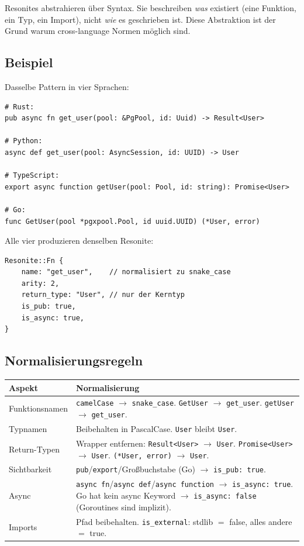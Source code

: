 \documentclass[11pt,a4paper]{article}
\begin{document}
Resonites abstrahieren \"uber Syntax. Sie beschreiben 
\emph{was} existiert (eine Funktion, ein Typ, ein Import), 
nicht \emph{wie} es geschrieben ist. Diese Abstraktion ist 
der Grund warum cross-language Normen m\"oglich sind.

\subsection{Beispiel}

Dasselbe Pattern in vier Sprachen:

\begin{lstlisting}[style=bash]
# Rust:
pub async fn get_user(pool: &PgPool, id: Uuid) -> Result<User>

# Python:
async def get_user(pool: AsyncSession, id: UUID) -> User

# TypeScript:
export async function getUser(pool: Pool, id: string): Promise<User>

# Go:
func GetUser(pool *pgxpool.Pool, id uuid.UUID) (*User, error)
\end{lstlisting}

Alle vier produzieren denselben Resonite:

\begin{lstlisting}[style=rust]
Resonite::Fn {
    name: "get_user",    // normalisiert zu snake_case
    arity: 2,
    return_type: "User", // nur der Kerntyp
    is_pub: true,
    is_async: true,
}
\end{lstlisting}

\subsection{Normalisierungsregeln}

\begin{longtable}{lp{8cm}}
\toprule
\textbf{Aspekt} & \textbf{Normalisierung} \\
\midrule
Funktionsnamen 
  & \texttt{camelCase} $\to$ \texttt{snake\_case}. 
    \texttt{GetUser} $\to$ \texttt{get\_user}. 
    \texttt{getUser} $\to$ \texttt{get\_user}. \\
Typnamen
  & Beibehalten in PascalCase. \texttt{User} bleibt 
    \texttt{User}. \\
Return-Typen
  & Wrapper entfernen: \texttt{Result<User>} $\to$ 
    \texttt{User}. \texttt{Promise<User>} $\to$ 
    \texttt{User}. \texttt{(*User, error)} $\to$ 
    \texttt{User}. \\
Sichtbarkeit
  & \texttt{pub}/\texttt{export}/Gro{\ss}buchstabe (Go) 
    $\to$ \texttt{is\_pub: true}. \\
Async
  & \texttt{async fn}/\texttt{async def}/\texttt{async function} 
    $\to$ \texttt{is\_async: true}. Go hat kein async 
    Keyword $\to$ \texttt{is\_async: false} (Goroutines 
    sind implizit). \\
Imports
  & Pfad beibehalten. \texttt{is\_external}: 
    stdlib $=$ false, alles andere $=$ true. \\
\bottomrule
\end{longtable}
\end{document}
